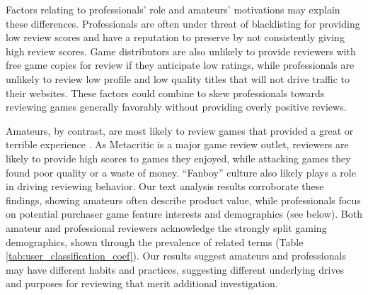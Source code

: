 \documentclass{sig-alternate}
\begin{document}
Factors relating to professionals' role and amateurs' motivations may
explain these differences. Professionals are often under threat of
blacklisting for providing low review scores and have a reputation to
preserve by not consistently giving high review scores. Game
distributors are also unlikely to provide reviewers with free game
copies for review if they anticipate low ratings, while professionals
are unlikely to review low profile and low quality titles that will not
drive traffic to their websites. These factors could combine to skew professionals towards reviewing games generally favorably without providing overly positive reviews.

Amateurs, by contrast, are most likely to review games that provided a great or terrible experience \cite{gilbert2010deja}. As Metacritic is a major game review outlet, reviewers are likely to provide high scores to games they enjoyed, while attacking games they found poor quality or a waste of money. ``Fanboy'' culture also likely plays a role in driving reviewing behavior. Our text analysis results corroborate these findings, showing amateurs often describe product value, while professionals focus on potential purchaser game feature interests and demographics (see below). Both amateur and professional reviewers acknowledge the strongly split gaming demographics, shown through the prevalence of related terms (Table \ref{tab:user_classification_coef}). 
Our results suggest amateurs and professionals may have different habits and practices, suggesting different underlying drives and purposes for reviewing that merit additional investigation.
\end{document}
